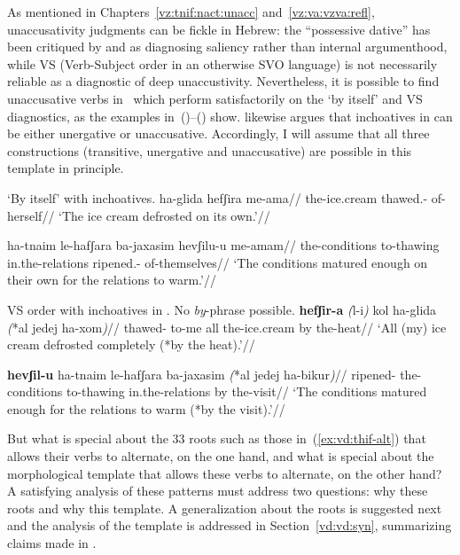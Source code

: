 As mentioned in Chapters~\ref{vz:tnif:nact:unacc} and~\ref{vz:va:vzva:refl}, unaccusativity judgments can be fickle in Hebrew: the ``possessive dative'' has been critiqued by \cite{gafter14li} and \cite{linzen14pd} as diagnosing saliency rather than internal argumenthood, while VS (Verb-Subject order in an otherwise SVO language) is not necessarily reliable as a diagnostic of deep unaccustivity. Nevertheless, it is possible to find unaccusative verbs in \thif~which perform satisfactorily on the `by itself' and VS diagnostics, as the examples in~(\nextx)--(\anextx) show. \citet[149]{borer91} likewise argues that inchoatives in {\thif} can be either unergative or unaccusative. Accordingly, I will assume that all three constructions (transitive, unergative and unaccusative) are possible in this template in principle.

\pex `By itself' with {\thif} inchoatives.
	\a \begingl
		\gla ha-glida hefʃira me-a{\ts}ma//
		\glb the-ice.cream thawed.- of-herself//
		\glft `The ice cream defrosted on its own.'//
	\endgl
	
	\a \begingl
		\gla ha-tnaim le-hafʃara ba-jaxasim hevʃilu-u me-a{\ts}mam//
		\glb the-conditions to-thawing in.the-relations ripened.- of-themselves//
		\glft `The conditions matured enough on their own for the relations to warm.'//
	\endgl
\xe

\pex\label{ex:vd:vs} VS order with {\thif} inchoatives in \thif. No \emph{by}-phrase possible.
	\a \begingl
		\gla \textbf{hefʃir-a} \emph{(}l-i\emph{)} kol ha-glida \emph{(}*{al jedej} ha-xom\emph{)}//
		\glb thawed- to-me all the-ice.cream \phantom{*(}by the-heat//
		\glft `All (my) ice cream defrosted completely (*by the heat).'//
	\endgl
	
	\a \begingl
		\gla \textbf{hevʃil-u} ha-tnaim le-hafʃara ba-jaxasim \emph{(}*{al jedej} ha-bikur\emph{)}//
		\glb ripened- the-conditions to-thawing in.the-relations \phantom{*(}by the-visit//
		\glft `The conditions matured enough for the relations to warm (*by the visit).'//
	\endgl
\xe

But what is special about the 33 roots such as those in~(\ref{ex:vd:thif-alt}) that allows their verbs to alternate, on the one hand, and what is special about the morphological template that allows these verbs to alternate, on the other hand? A satisfying analysis of these patterns must address two questions: why these roots and why this template. A generalization about the roots is suggested next and the analysis of the template is addressed in Section~\ref{vd:vd:syn}, summarizing claims made in \cite{kastner19tlr}.

